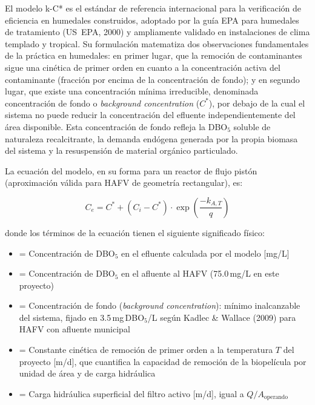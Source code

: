 \documentclass[12pt,a4paper]{article}
\newcommand{\captionequation}[1]{}
\begin{document}
El modelo k-C* es el estándar de referencia internacional para la verificación de eficiencia en humedales construidos, adoptado por la guía EPA para humedales de tratamiento (US~EPA, 2000) y ampliamente validado en instalaciones de clima templado y tropical. Su formulación matematiza dos observaciones fundamentales de la práctica en humedales: en primer lugar, que la remoción de contaminantes sigue una cinética de primer orden en cuanto a la concentración activa del contaminante (fracción por encima de la concentración de fondo); y en segundo lugar, que existe una concentración mínima irreducible, denominada concentración de fondo o \textit{background concentration} ($C^*$), por debajo de la cual el sistema no puede reducir la concentración del efluente independientemente del área disponible. Esta concentración de fondo refleja la DBO$_5$ soluble de naturaleza recalcitrante, la demanda endógena generada por la propia biomasa del sistema y la resuspensión de material orgánico particulado.

La ecuación del modelo, en su forma para un reactor de flujo pistón (aproximación válida para HAFV de geometría rectangular), es:

\begin{equation}
C_e = C^* + (C_i - C^*) \cdot \exp\!\left(\frac{-k_{A,T}}{q}\right)
\label{eq:kC_star}
\end{equation}
\captionequation{Modelo cinético k-C* para humedales de flujo vertical -- Kadlec \& Wallace (2009)}

donde los términos de la ecuación tienen el siguiente significado físico:

\begin{itemize}[noitemsep,leftmargin=2em]
    \item[$C_e$] = Concentración de DBO$_5$ en el efluente calculada por el modelo [mg/L]
    \item[$C_i$] = Concentración de DBO$_5$ en el afluente al HAFV (75.0\,mg/L en este proyecto)
    \item[$C^*$] = Concentración de fondo (\textit{background concentration}): mínimo inalcanzable del sistema, fijado en 3.5\,mg\,DBO$_5$/L según Kadlec \& Wallace (2009) para HAFV con afluente municipal
    \item[$k_{A,T}$] = Constante cinética de remoción de primer orden a la temperatura $T$ del proyecto [m/d], que cuantifica la capacidad de remoción de la biopelícula por unidad de área y de carga hidráulica
    \item[$q$] = Carga hidráulica superficial del filtro activo [m/d], igual a $Q / A_\text{operando}$
\end{itemize}
\end{document}
